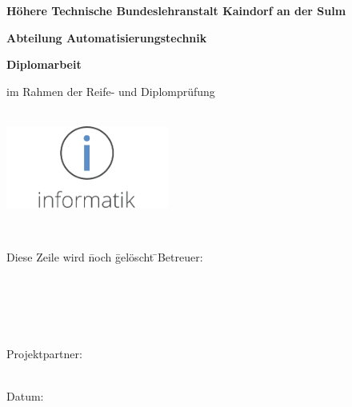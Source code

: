 \begin{titlepage}
	
	{\textbf {Höhere Technische Bundeslehranstalt Kaindorf an der Sulm}\par\vspace{0.3cm}}
	{\textbf {Abteilung Automatisierungstechnik}\par	\vspace{0.7cm}}
	\Large{\textbf{Diplomarbeit}}\par\vspace{0.2cm}
	\small im Rahmen der Reife- und Diplomprüfung\par
	\vspace{1.5cm}
	\Huge\textbf{\daTitle}\\
	\vspace{1cm}
	\includegraphics[width=0.4\textwidth]{images/inf_farbe_2.pdf}\\
	\vspace{1cm}
	\normalsize \daAuthorOne \par
	\normalsize \daAuthorTwo \par
	\normalsize \daAuthorThree \par
	\vspace{0,5cm}
	\daGrade\\ \daYear
	\vfill
	\begin{flushleft}
	\begin{tabbing}
	Diese Zeile wird \= noch \= gelöscht \=  \kill\vspace{0.2cm}Betreuer:\> \daSupervisorOne\par 
	\\\vspace{0.2cm}\> \daSupervisorTwo \par 
	\\\vspace{0.2cm}\> \daSupervisorThree \par 
	\\\vspace{0.2cm}Projektpartner:\> \daPartner \par
	\\Datum:\> \daDocDate
	\end{tabbing}
	\end{flushleft}
\end{titlepage}